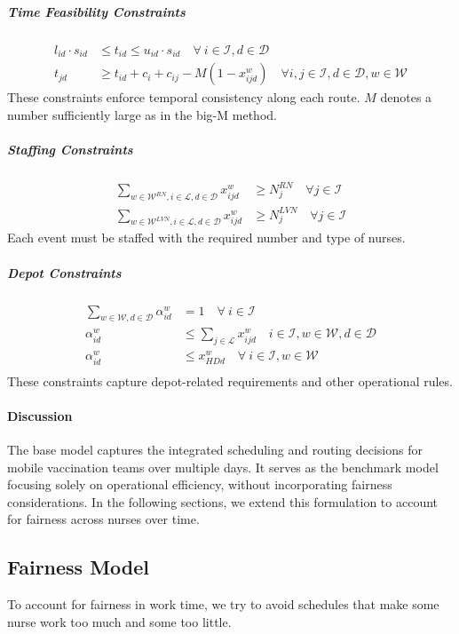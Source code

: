 \subparagraph{Time Feasibility Constraints}
\begin{align}
    l_{id} \cdot s_{id} &\leq t_{id} \leq u_{id} \cdot s_{id} \quad \forall \ i \in \mathcal{I}, d \in \mathcal{D}\\
    t_{jd} &\geq t_{id} + c_i + c_{ij} - M (1-x_{ijd}^w) \quad \forall i, j \in \mathcal{I}, d \in \mathcal{D}, w \in \mathcal{W}
\end{align}
These constraints enforce temporal consistency along each route. $M$ denotes a number sufficiently large as in the big-M method.

\subparagraph{Staffing Constraints}
\begin{align}
    \sum_{w \in \mathcal{W}^{RN}, i \in \mathcal{L},d\in\mathcal{D}} x_{ijd}^w  &\geq N_j^{RN} \quad \forall j \in \mathcal{I}\\
    \sum_{w \in \mathcal{W}^{LVN}, i \in \mathcal{L},d\in\mathcal{D}} x_{ijd}^w  &\geq N_j^{LVN} \quad \forall j \in \mathcal{I}
\end{align}
Each event must be staffed with the required number and type of nurses.

\subparagraph{Depot Constraints}
\begin{align}
        \sum_{w\in\mathcal{W}, d \in \mathcal{D}} \alpha_{id}^w &= 1 \quad \forall \ i\in\mathcal{I}\\
        \alpha_{id}^w &\leq \sum_{j\in\mathcal{L}} x_{ijd}^w \quad i\in\mathcal{I}, w\in\mathcal{W}, d\in\mathcal{D}\\
        \alpha_{id}^w &\leq x_{HDd}^w \quad \forall \ i \in\mathcal{I}, w\in\mathcal{W}\\
\end{align}
These constraints capture depot-related requirements and other operational rules.



\paragraph{Discussion}
The base model captures the integrated scheduling and routing decisions for mobile vaccination teams over multiple days. It serves as the benchmark model focusing solely on operational efficiency, without incorporating fairness considerations. In the following sections, we extend this formulation to account for fairness across nurses over time.


\subsection{Fairness Model}
To account for fairness in work time, we try to avoid schedules that make some nurse work too much and some too little. 

